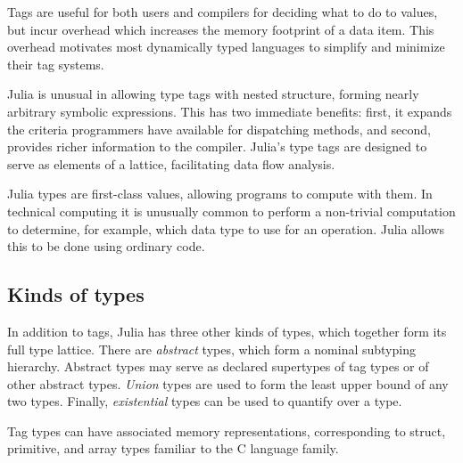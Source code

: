 \documentclass[10pt, preprint]{sigplanconf}
\begin{document}
Tags are useful for both users and compilers for deciding what to do
to values, but incur overhead which increases the memory footprint of a data
item. This overhead motivates most dynamically typed languages to simplify and
minimize their tag systems.

Julia is unusual in allowing type tags with nested structure, forming nearly
arbitrary symbolic expressions. This has two immediate benefits: first,
it expands the criteria programmers have available for dispatching methods,
and second, provides richer information to the compiler.
Julia's type tags are designed to serve as elements of a lattice,
facilitating data flow analysis.

%
Julia types are first-class values, allowing programs to compute with them.
In technical computing it is unusually common to perform a non-trivial
computation to determine, for example, which data type to use for an operation.
Julia allows this to be done using ordinary code.

\subsection{Kinds of types}

In addition to tags, Julia has three other kinds of types, which together form
its full type lattice.
There are \emph{abstract} types, which form a nominal subtyping hierarchy.
Abstract types may serve as declared supertypes of tag types or of other abstract
types.
\emph{Union} types are used to form the least upper bound of any two types.
Finally, \emph{existential} types can be used to quantify over a type.

Tag types can have associated memory representations, corresponding to struct,
primitive, and array types familiar to the C language family.
\end{document}
